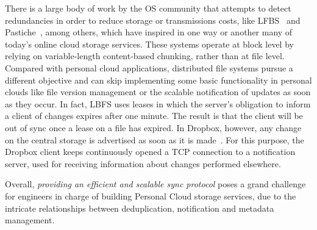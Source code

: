 There is a large body of work by the OS community that attempts to detect redundancies in order
to reduce storage or transmissions costs, like LFBS~\cite{Muthitacharoen01} and Pastiche~\cite{Cox02}, among others, which
have inspired in one way or another many of today's online cloud storage services. These systems
operate at block level by relying on variable-length content-based chunking, rather than at
file level. Compared with personal cloud applications, distributed file systems pursue a
different objective and can skip implementing some basic functionality in personal clouds like
file version management or the scalable notification of updates as soon as they occur. In fact,
LBFS uses leases in which the server's obligation to inform a client of changes expires after one
minute. The result is that the client will be out of sync once a lease on a file has expired. 
In Dropbox, however, any change on the central storage is advertised as soon as it is made~\cite{drago2012inside}.
For this purpose, the Dropbox client keeps continuously opened a TCP connection to a notification
server, used for receiving information about changes performed elsewhere.

Overall, \textit{providing an efficient and scalable sync protocol} poses a grand challenge for
engineers in charge of building Personal Cloud storage services, due to the intricate
relationships between deduplication, notification and metadata management.